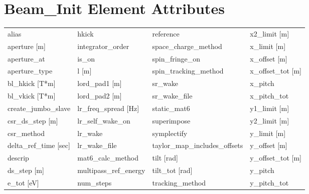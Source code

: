  \section{Beam_Init Element Attributes}
 \label{s:list.beam.init}
 
 \begin{tabular}{llll} \toprule
alias                            & hkick                            & reference                        & x2_limit [m]                     \\
aperture [m]                     & integrator_order                 & space_charge_method              & x_limit [m]                      \\
aperture_at                      & is_on                            & spin_fringe_on                   & x_offset [m]                     \\
aperture_type                    & l [m]                            & spin_tracking_method             & x_offset_tot [m]                 \\
bl_hkick [T*m]                   & lord_pad1 [m]                    & sr_wake                          & x_pitch                          \\
bl_vkick [T*m]                   & lord_pad2 [m]                    & sr_wake_file                     & x_pitch_tot                      \\
create_jumbo_slave               & lr_freq_spread [Hz]              & static_mat6                      & y1_limit [m]                     \\
csr_ds_step [m]                  & lr_self_wake_on                  & superimpose                      & y2_limit [m]                     \\
csr_method                       & lr_wake                          & symplectify                      & y_limit [m]                      \\
delta_ref_time [sec]             & lr_wake_file                     & taylor_map_includes_offsets      & y_offset [m]                     \\
descrip                          & mat6_calc_method                 & tilt [rad]                       & y_offset_tot [m]                 \\
ds_step [m]                      & multipass_ref_energy             & tilt_tot [rad]                   & y_pitch                          \\
e_tot [eV]                       & num_steps                        & tracking_method                  & y_pitch_tot                      \\

\end{tabular}
